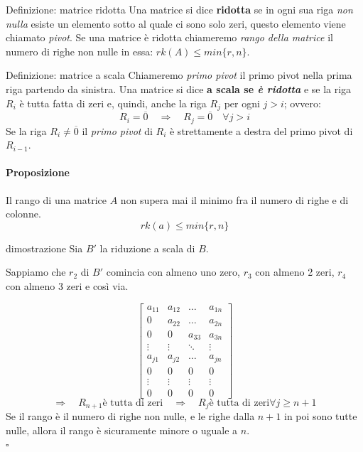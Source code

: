 \documentclass[x11names]{article}
\newcommand*{\QEDB}{\null\nobreak\hfill\ensuremath{\square}}%
\begin{document}
\begin{center}
\colorbox{myblue}{\begin{minipage}{5.75in}
\begin{blues}{Definizione: matrice ridotta}
    Una matrice si dice \textbf{ridotta} se in ogni sua riga \textit{non nulla} esiste un elemento sotto al quale ci sono solo zeri, questo elemento viene chiamato \textit{pivot}. Se una matrice è ridotta chiameremo \textit{rango della matrice} il numero di righe non nulle in essa: $rk(A) \leq min\{r,n\}$.
\end{blues}


\begin{blues}{Definizione: matrice a scala}
    Chiameremo \textit{primo pivot} il primo pivot nella prima riga partendo da sinistra. Una matrice si dice \textbf{a scala se \textit{è ridotta}} e se la riga $R_i$ è tutta fatta di zeri e, quindi, anche la riga $R_j$ per ogni $j>i$; ovvero: 
    $$
    R_i = \overline{0}\quad \Rightarrow \quad R_j = \overline{0} \quad \forall j>i
    $$
    Se la riga $R_i \neq \overline{0}$ il \textit{primo pivot} di $R_i$ è strettamente a destra del primo pivot di $R_{i-1}$.
\end{blues}
\end{minipage}}        
\end{center}


\paragraph{Proposizione}
Il rango di una matrice $A$ non supera mai il minimo fra il numero di righe e di colonne.
\[
rk\left(a\right) \leq min\{r,n\} 
\]

\begin{es}{dimostrazione}
Sia $B'$ la riduzione a scala di $B$.
 
Sappiamo che $r_2$ di $B'$ comincia con almeno uno zero, $r_3$ con almeno 2 zeri, $r_4$ con almeno 3 zeri e così via. 

\[
\begin{bmatrix}
	a_{11} & a_{12} & \dots & a_{1n}  \\
	0     & a_{22}& \dots & a_{2n}  \\
	0 & 0 & a_{33} &  a_{3n}  \\
	\vdots & \vdots & \ddots & \vdots \\
	a_{j1} & a_{j2} & \dots & a_{jn}  \\
	0 & 0 & 0 & 0 \\
	\vdots &\vdots &\vdots &\vdots \\
	0 & 0 & 0 & 0 
\end{bmatrix}
\] 
\[
\Rightarrow \quad R_{n+1} \text{è tutta di zeri}
\quad \Rightarrow \quad R_{j} \text{è tutta di zeri} \forall j \geq n + 1
\]
Se il rango è il numero di righe non nulle, e le righe dalla $n+1$ in poi sono tutte nulle, allora il rango è sicuramente minore o uguale a $n$. 
\\
\QEDB
\end{es}
\end{document}
